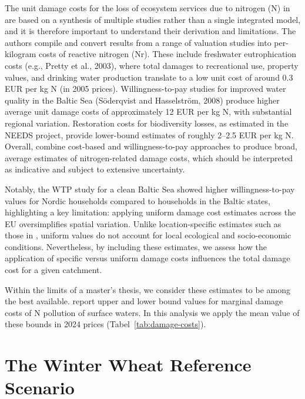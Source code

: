 \documentclass[12pt]{article}
\begin{document}
The unit damage costs for the loss of ecosystem services due to nitrogen (N) in \cite{brink2011} are based on a synthesis of multiple studies rather than a single integrated model, and it is therefore important to understand their derivation and limitations. The authors compile and convert results from a range of valuation studies into per-kilogram costs of reactive nitrogen (Nr). These include freshwater eutrophication costs (e.g., Pretty et al., 2003), where total damages to recreational use, property values, and drinking water production translate to a low unit cost of around 0.3 EUR per kg N (in 2005 prices). Willingness-to-pay studies for improved water quality in the Baltic Sea (Söderqvist and Hasselström, 2008) produce higher average unit damage costs of approximately 12 EUR per kg N, with substantial regional variation. Restoration costs for biodiversity losses, as estimated in the NEEDS project, provide lower-bound estimates of roughly 2--2.5 EUR per kg N. Overall, \cite{brink2011} combine cost-based and willingness-to-pay approaches to produce broad, average estimates of nitrogen-related damage costs, which should be interpreted as indicative and subject to extensive uncertainty.



Notably, the WTP study for a clean Baltic Sea showed higher willingness-to-pay values for Nordic households compared to households in the Baltic states, highlighting a key limitation: applying uniform damage cost estimates across the EU oversimplifies spatial variation. Unlike location-specific estimates such as those in \cite{andersen2019}, uniform values do not account for local ecological and socio-economic conditions. Nevertheless, by including these estimates, we assess how the application of specific versus uniform damage costs influences the total damage cost for a given catchment. 



Within the limits of a master's thesis, we consider these estimates to be among the best available. \cite{brink2011} report upper and lower bound values for marginal damage costs of N pollution of surface waters. In this analysis we apply the mean value of these bounds in 2024 prices (Tabel~\ref{tab:damage-costs}).




\section{The Winter Wheat Reference Scenario}
\end{document}
